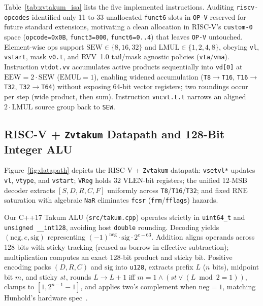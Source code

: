 \documentclass[conference]{IEEEtran}
\begin{document}
Table~\ref{tab:zvtakum_isa} lists the five implemented instructions. Auditing \texttt{riscv-opcodes} identified only 11 to 33 unallocated \texttt{funct6} slots in \texttt{OP-V} reserved for future standard extensions, motivating a clean allocation in RISC-V's \texttt{custom-0} space (\texttt{opcode=0x0B}, \texttt{funct3=000}, \texttt{funct6=0..4}) that leaves \texttt{OP-V} untouched. Element-wise ops support $\mathrm{SEW}\in\{8,16,32\}$ and $\mathrm{LMUL}\in\{1,2,4,8\}$, obeying \texttt{vl}, \texttt{vstart}, mask \texttt{v0.t}, and RVV~1.0 tail/mask agnostic policies (\texttt{vta}/\texttt{vma}). Instruction \texttt{vtdot.vv} accumulates active products sequentially into \texttt{vd[0]} at $\mathrm{EEW}=2\cdot\mathrm{SEW}$ ($\mathrm{EMUL}=1$), enabling widened accumulation (\texttt{T8$\to$T16}, \texttt{T16$\to$T32}, \texttt{T32$\to$T64}) without exposing 64-bit vector registers; two roundings occur per step (wide product, then sum). Instruction \texttt{vncvt.t.t} narrows an aligned $2\cdot\mathrm{LMUL}$ source group back to \texttt{SEW}.

\subsection{RISC-V + \texttt{Zvtakum} Datapath and 128-Bit Integer ALU}
Figure~\ref{fig:datapath} depicts the RISC-V + \texttt{Zvtakum} datapath: \texttt{vsetvl*} updates \texttt{vl}, \texttt{vtype}, and \texttt{vstart}; \texttt{VReg} holds 32 $\mathrm{VLEN}$-bit registers; the unified 12-MSB decoder extracts $[S,D,R,C,F]$ uniformly across \texttt{T8}/\texttt{T16}/\texttt{T32}; and fixed RNE saturation with algebraic \texttt{NaR} eliminates \texttt{fcsr} (\texttt{frm}/\texttt{fflags}) hazards.

Our C++17 Takum ALU (\texttt{src/takum.cpp}) operates strictly in \texttt{uint64\_t} and \texttt{unsigned \_\_int128}, avoiding host \texttt{double} rounding. Decoding yields $(\mathrm{neg}, e, \mathrm{sig})$ representing $(-1)^{\mathrm{neg}}\cdot\mathrm{sig}\cdot 2^{e-63}$. Addition aligns operands across 128 bits with sticky tracking (reused as borrow in effective subtraction); multiplication computes an exact 128-bit product and sticky bit. Positive encoding packs $(D,R,C)$ and $\mathrm{sig}$ into \texttt{u128}, extracts prefix $L$ ($n$ bits), midpoint bit $m$, and sticky $\mathit{st}$, rounds $L \to L+1$ iff $m=1 \land (\mathit{st} \lor (L\bmod 2 = 1))$, clamps to $[1, 2^{n-1}-1]$, and applies two's complement when $\mathrm{neg}=1$, matching Hunhold's hardware spec~\cite{hunhold2024vhdl}.
\end{document}
